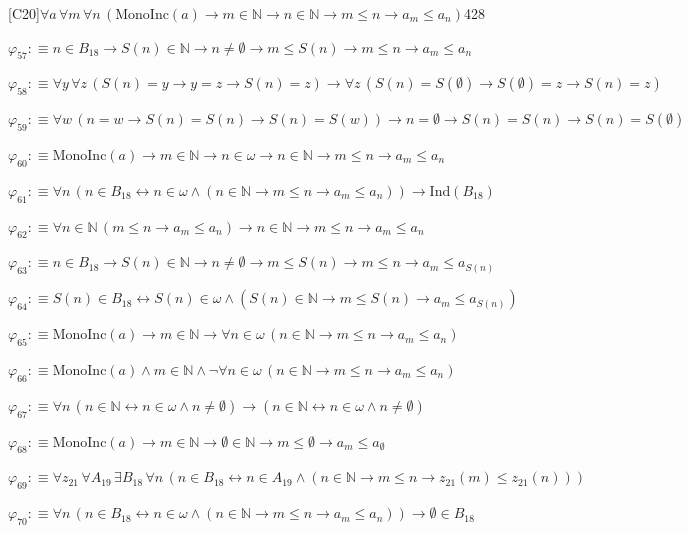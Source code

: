 \begin{fullproof}{[C20]}{$\forall a\,\forall m\,\forall n\,(\mathrm{MonoInc}(a) \to m \in \mathbb{N} \to n \in \mathbb{N} \to m \leq n \to a_{m} \leq a_{n})$}{428}
\begin{abbrevlist}
\item $\varphi_{57} :\equiv n \in B_{18} \to S(n) \in \mathbb{N} \to n \neq \emptyset \to m \leq S(n) \to m \leq n \to a_{m} \leq a_{n}$
\item $\varphi_{58} :\equiv \forall y\,\forall z\,(S(n) = y \to y = z \to S(n) = z) \to \forall z\,(S(n) = S(\emptyset) \to S(\emptyset) = z \to S(n) = z)$
\item $\varphi_{59} :\equiv \forall w\,(n = w \to S(n) = S(n) \to S(n) = S(w)) \to n = \emptyset \to S(n) = S(n) \to S(n) = S(\emptyset)$
\item $\varphi_{60} :\equiv \mathrm{MonoInc}(a) \to m \in \mathbb{N} \to n \in \omega \to n \in \mathbb{N} \to m \leq n \to a_{m} \leq a_{n}$
\item $\varphi_{61} :\equiv \forall n\,(n \in B_{18} \leftrightarrow n \in \omega \land (n \in \mathbb{N} \to m \leq n \to a_{m} \leq a_{n})) \to \mathrm{Ind}(B_{18})$
\item $\varphi_{62} :\equiv \forall n \in \mathbb{N}\,(m \leq n \to a_{m} \leq a_{n}) \to n \in \mathbb{N} \to m \leq n \to a_{m} \leq a_{n}$
\item $\varphi_{63} :\equiv n \in B_{18} \to S(n) \in \mathbb{N} \to n \neq \emptyset \to m \leq S(n) \to m \leq n \to a_{m} \leq a_{S(n)}$
\item $\varphi_{64} :\equiv S(n) \in B_{18} \leftrightarrow S(n) \in \omega \land (S(n) \in \mathbb{N} \to m \leq S(n) \to a_{m} \leq a_{S(n)})$
\item $\varphi_{65} :\equiv \mathrm{MonoInc}(a) \to m \in \mathbb{N} \to \forall n \in \omega\,(n \in \mathbb{N} \to m \leq n \to a_{m} \leq a_{n})$
\item $\varphi_{66} :\equiv \mathrm{MonoInc}(a) \land m \in \mathbb{N} \land \neg \forall n \in \omega\,(n \in \mathbb{N} \to m \leq n \to a_{m} \leq a_{n})$
\item $\varphi_{67} :\equiv \forall n\,(n \in \mathbb{N} \leftrightarrow n \in \omega \land n \neq \emptyset) \to (n \in \mathbb{N} \leftrightarrow n \in \omega \land n \neq \emptyset)$
\item $\varphi_{68} :\equiv \mathrm{MonoInc}(a) \to m \in \mathbb{N} \to \emptyset \in \mathbb{N} \to m \leq \emptyset \to a_{m} \leq a_{\emptyset}$
\item $\varphi_{69} :\equiv \forall z_{21}\,\forall A_{19}\,\exists B_{18}\,\forall n\,(n \in B_{18} \leftrightarrow n \in A_{19} \land (n \in \mathbb{N} \to m \leq n \to z_{21}(m) \leq z_{21}(n)))$
\item $\varphi_{70} :\equiv \forall n\,(n \in B_{18} \leftrightarrow n \in \omega \land (n \in \mathbb{N} \to m \leq n \to a_{m} \leq a_{n})) \to \emptyset \in B_{18}$

\end{abbrevlist}
\end{fullproof}
